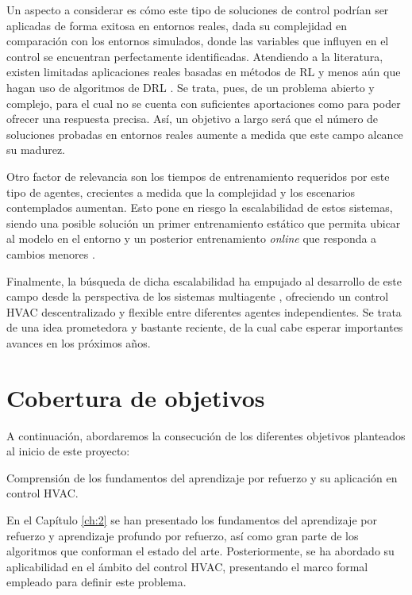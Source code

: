 Un aspecto a considerar es cómo este tipo de soluciones de control podrían ser aplicadas de forma exitosa en entornos reales, dada su complejidad en comparación con los entornos simulados, donde las variables que influyen en el control se encuentran perfectamente identificadas. Atendiendo a la literatura, existen limitadas aplicaciones reales basadas en métodos de RL \cite{costanzo2016experimental,wang2020reinforcement} y menos aún que hagan uso de algoritmos de DRL \cite{wang2020reinforcement}. Se trata, pues, de un problema abierto y complejo, para el cual no se cuenta con suficientes aportaciones como para poder ofrecer una respuesta precisa. Así, un objetivo a largo será que el número de soluciones probadas en entornos reales aumente a medida que este campo alcance su madurez.

Otro factor de relevancia son los tiempos de entrenamiento requeridos por este tipo de agentes, crecientes a medida que la complejidad y los escenarios contemplados aumentan. Esto pone en riesgo la escalabilidad de estos sistemas, siendo una posible solución un primer entrenamiento estático que permita ubicar al modelo en el entorno y un posterior entrenamiento \textit{online} que responda a cambios menores \cite{azuatalam2020reinforcement}.

Finalmente, la búsqueda de dicha escalabilidad ha empujado al desarrollo de este campo desde la perspectiva de los sistemas multiagente \cite{nagarathinam2020marco,yu2020multi,li2015multi}, ofreciendo un control HVAC descentralizado y flexible entre diferentes agentes independientes. Se trata de una idea prometedora y bastante reciente, de la cual cabe esperar importantes avances en los próximos años.

\section{Cobertura de objetivos}

A continuación, abordaremos la consecución de los diferentes objetivos planteados al inicio de este proyecto:

\begin{tcolorbox}[colbacktitle=green!30!white, title=Subobjetivo 1, coltitle=black, fonttitle=\bfseries]
Comprensión de los fundamentos del aprendizaje por refuerzo y su aplicación en control HVAC.
\end{tcolorbox}

En el Capítulo \ref{ch:2} se han presentado los fundamentos del aprendizaje por refuerzo y aprendizaje profundo por refuerzo, así como gran parte de los algoritmos que conforman el estado del arte. Posteriormente, se ha abordado su aplicabilidad en el ámbito del control HVAC, presentando el marco formal empleado para definir este problema.

